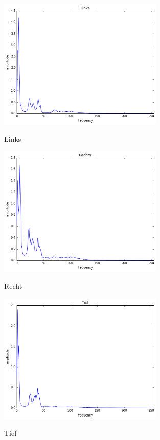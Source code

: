 \documentclass[TGAI_Laborbericht.tex]{subfiles}
\begin{document}
\begin{figure}[H]
	\includegraphics[width=0.7\textwidth]{media/links.png}
	\label{Links}
	\caption{Links}
\end{figure}

\begin{figure}[H]
	\includegraphics[width=0.7\textwidth]{media/rechts.png}
	\label{Rechts}
	\caption{Recht}
\end{figure}

\begin{figure}[H]
	\includegraphics[width=0.7\textwidth]{media/tief.png}
	\label{Tief}
	\caption{Tief}
\end{figure}
\end{document}
